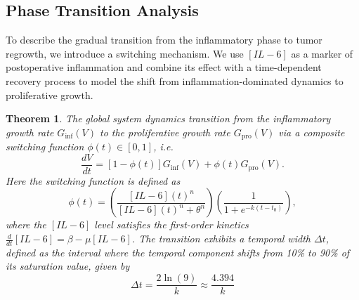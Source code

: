 \documentclass[11pt, reqno]{amsart}
\numberwithin{equation}{section}
\newtheorem{theorem}{Theorem}[section]
\theoremstyle{definition}
\begin{document}
\subsection{Phase Transition Analysis}
To describe the gradual transition from the inflammatory phase to tumor regrowth, we introduce a switching mechanism. We use $[IL-6]$ as a marker of postoperative inflammation and combine its effect with a time-dependent recovery process to model the shift from inflammation-dominated dynamics to proliferative growth.

\begin{theorem}%
The global system dynamics transition from the inflammatory growth rate $G_{\text{inf}}(V)$ to the proliferative growth rate $G_{\text{pro}}(V)$ via a composite switching function $\phi(t) \in [0,1]$, i.e.
\begin{equation}
\frac{dV}{dt} = [1 - \phi(t)] G_{\text{inf}}(V) + \phi(t) G_{\text{pro}}(V).
\end{equation}
Here the switching function is defined as
\begin{equation}
\phi(t) = \left( \frac{[IL-6](t)^n}{[IL-6](t)^n + \theta^n} \right) \left( \frac{1}{1 + e^{-k(t-t_0)}} \right),
\end{equation}
where the $[IL-6]$ level satisfies the first-order kinetics $\frac{d}{dt}[IL-6] = \beta - \mu[IL-6]$. The transition exhibits a temporal width $\Delta t$, defined as the interval where the temporal component shifts from 10\% to 90\% of its saturation value, given by
\begin{equation}
\Delta t = \frac{2\ln(9)}{k} \approx \frac{4.394}{k}
\end{equation}
\end{theorem}
\end{document}
